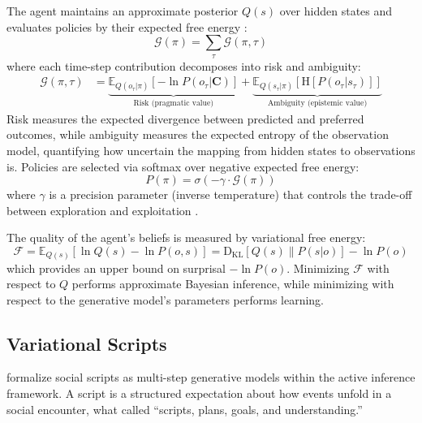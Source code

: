 \documentclass[11pt,a4paper]{article}
\newcommand{\vfe}{\mathcal{F}}
\newcommand{\efe}{\mathcal{G}}
\newcommand{\CC}{\mathbf{C}}
\newcommand{\E}{\mathbb{E}}
\newcommand{\KL}{\mathrm{D}_{\mathrm{KL}}}
\newcommand{\HH}{\mathrm{H}}
\begin{document}
The agent maintains an approximate posterior $Q(s)$ over hidden states and evaluates policies by their expected free energy \citep{friston2017active,parr2019generalised}:
\begin{equation}
  \efe(\pi) = \sum_{\tau} \efe(\pi, \tau)
  \label{eq:efe-sum}
\end{equation}
where each time-step contribution decomposes into risk and ambiguity:
\begin{align}
  \efe(\pi, \tau) &= \underbrace{\E_{Q(o_\tau|\pi)}\left[-\ln P(o_\tau | \CC)\right]}_{\text{Risk (pragmatic value)}} + \underbrace{\E_{Q(s_\tau|\pi)}\left[\HH[P(o_\tau | s_\tau)]\right]}_{\text{Ambiguity (epistemic value)}}
  \label{eq:efe-decomposition}
\end{align}
Risk measures the expected divergence between predicted and preferred outcomes, while ambiguity measures the expected entropy of the observation model, quantifying how uncertain the mapping from hidden states to observations is.  Policies are selected via softmax over negative expected free energy:
\begin{equation}
  P(\pi) = \sigma(-\gamma \cdot \efe(\pi))
  \label{eq:policy-selection}
\end{equation}
where $\gamma$ is a precision parameter (inverse temperature) that controls the trade-off between exploration and exploitation \citep{friston2015active}.

The quality of the agent's beliefs is measured by variational free energy:
\begin{equation}
  \vfe = \E_{Q(s)}[\ln Q(s) - \ln P(o, s)] = \KL[Q(s) \| P(s|o)] - \ln P(o)
  \label{eq:vfe}
\end{equation}
which provides an upper bound on surprisal $-\ln P(o)$.  Minimizing $\vfe$ with respect to $Q$ performs approximate Bayesian inference, while minimizing with respect to the generative model's parameters performs learning.

\subsection{Variational Scripts}

\citet{albarracin2021variational} formalize social scripts as multi-step generative models within the active inference framework.  A script is a structured expectation about how events unfold in a social encounter, what \citet{schank1977scripts} called ``scripts, plans, goals, and understanding.''
\end{document}
